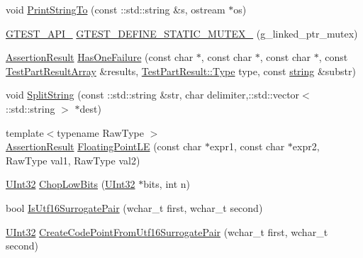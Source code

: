 \begin{DoxyCompactItemize}
\item 
void \hyperlink{namespacetesting_1_1internal_ad609167d8d6792b0fb186539e0e159bd}{Print\+String\+To} (const \+::std\+::string \&s, ostream $\ast$os)
\item 
\hyperlink{gtest-port_8h_aa73be6f0ba4a7456180a94904ce17790}{G\+T\+E\+S\+T\+\_\+\+A\+P\+I\+\_\+} \hyperlink{namespacetesting_1_1internal_aff419d76acc3727be48d195f927189c9}{G\+T\+E\+S\+T\+\_\+\+D\+E\+F\+I\+N\+E\+\_\+\+S\+T\+A\+T\+I\+C\+\_\+\+M\+U\+T\+E\+X\+\_\+} (g\+\_\+linked\+\_\+ptr\+\_\+mutex)
\item 
\hyperlink{classtesting_1_1_assertion_result}{Assertion\+Result} \hyperlink{namespacetesting_1_1internal_a14ff02e6d151f45e998657674e9af88a}{Has\+One\+Failure} (const char $\ast$, const char $\ast$, const char $\ast$, const \hyperlink{classtesting_1_1_test_part_result_array}{Test\+Part\+Result\+Array} \&results, \hyperlink{classtesting_1_1_test_part_result_a65ae656b33fdfdfffaf34858778a52d5}{Test\+Part\+Result\+::\+Type} type, const \hyperlink{namespacetesting_1_1internal_a8e8ff5b11e64078831112677156cb111}{string} \&substr)
\item 
void \hyperlink{namespacetesting_1_1internal_aa013dc1d62981cbad93c2fffa0192921}{Split\+String} (const \+::std\+::string \&str, char delimiter,\+::std\+::vector$<$ \+::std\+::string $>$ $\ast$dest)
\item 
{\footnotesize template$<$typename Raw\+Type $>$ }\\\hyperlink{classtesting_1_1_assertion_result}{Assertion\+Result} \hyperlink{namespacetesting_1_1internal_a17b52b6b1f81f6dcad5cc4d12e5173a6}{Floating\+Point\+LE} (const char $\ast$expr1, const char $\ast$expr2, Raw\+Type val1, Raw\+Type val2)
\item 
\hyperlink{namespacetesting_1_1internal_a40d4fffcd2bf56f18b1c380615aa85e3}{U\+Int32} \hyperlink{namespacetesting_1_1internal_a2c54b453387aa8a18f2f3e09f10b5a7d}{Chop\+Low\+Bits} (\hyperlink{namespacetesting_1_1internal_a40d4fffcd2bf56f18b1c380615aa85e3}{U\+Int32} $\ast$bits, int n)
\item 
bool \hyperlink{namespacetesting_1_1internal_a681895f8cc32286211be9889da107394}{Is\+Utf16\+Surrogate\+Pair} (wchar\+\_\+t first, wchar\+\_\+t second)
\item 
\hyperlink{namespacetesting_1_1internal_a40d4fffcd2bf56f18b1c380615aa85e3}{U\+Int32} \hyperlink{namespacetesting_1_1internal_ac8ef1bb10cd9e69de939789b759e6bc9}{Create\+Code\+Point\+From\+Utf16\+Surrogate\+Pair} (wchar\+\_\+t first, wchar\+\_\+t second)
\item 

\end{DoxyCompactItemize}
